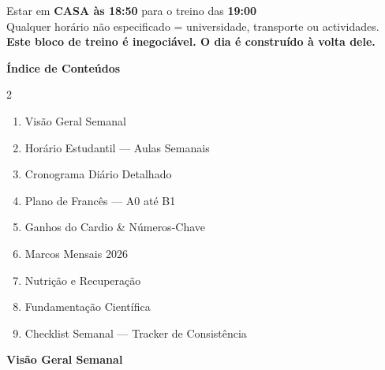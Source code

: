 \documentclass[a4paper,11pt]{article}
\newcommand{\mysection}[1]{%
  \vspace{16pt}
  \noindent\colorbox{dark}{\parbox{\linewidth}{\color{white}\large\bfseries\quad #1}}
  \vspace{8pt}\par
}
\begin{document}
\vspace{1.5cm}

\begin{center}
\end{center}

\vspace{1cm}

\begin{tcolorbox}[pilarbox, title={$\bigstar$ O PILAR CENTRAL}, width=\textwidth]
  \centering
  {\large Estar em \textbf{CASA às 18:50} para o treino das \textbf{19:00}}\\[6pt]
  {\small Qualquer horário não especificado = universidade, transporte ou actividades.}\\[4pt]
  {\color{accent}\bfseries Este bloco de treino é inegociável. O dia é construído à volta dele.}
\end{tcolorbox}

\newpage
\pagecolor{white}
\color{dark}

\mysection{Índice de Conteúdos}

\vspace{8pt}

\begin{multicols}{2}
\begin{enumerate}[label=\textbf{\arabic*.}]
  \item Visão Geral Semanal
  \item Horário Estudantil — Aulas Semanais
  \item Cronograma Diário Detalhado
  \item Plano de Francês — A0 até B1
  \item Ganhos do Cardio \& Números-Chave
  \item Marcos Mensais 2026
  \item Nutrição e Recuperação
  \item Fundamentação Científica
  \item Checklist Semanal — Tracker de Consistência
\end{enumerate}
\end{multicols}

\newpage

\mysection{Visão Geral Semanal}
\end{document}
